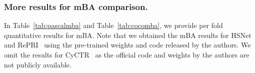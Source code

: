 \begin{table}[t]
    \begin{center}
    \end{center}\vspace{-10pt}
        \caption{\textbf{mBA comparison on COCO-20~\cite{lin2014microsoft}.}}\label{tab:cocomba}\vspace{-10pt}
\end{table}


\subsubsection{More results for mBA comparison.}
In Table~\ref{tab:pascalmba} and Table~\ref{tab:cocomba}, we provide per fold quantitative results for mBA. Note that we obtained the mBA results for HSNet~\cite{min2021hypercorrelation} and RePRI~\cite{boudiaf2021few} using the pre-trained weights and code released by the authors. We omit the results for   CyCTR~\cite{zhang2021few} as the official code and weights by the authors are not publicly available. 

